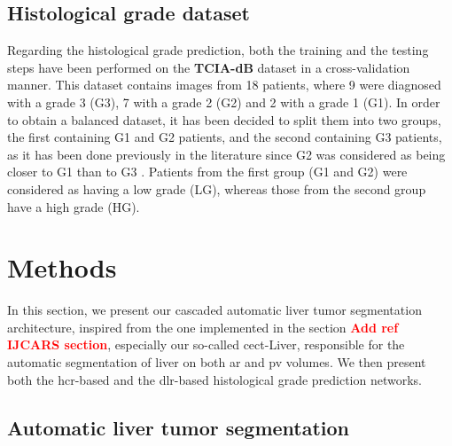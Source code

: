 \documentclass[]{article}
\newcommand{\pplfont}[1]{{\fontfamily{ppl}\selectfont #1}}
\newcommand{\lmttfont}[1]{{\fontfamily{lmtt}\selectfont #1}}
\newcommand{\todo}[1]{{\textcolor{red}{\textbf{#1}}}}
\begin{document}
\subsection{Histological grade dataset}

Regarding the histological grade prediction, both the training and the testing steps have been performed on the \textbf{\lmttfont{TCIA-dB}} dataset in a cross-validation manner.
This dataset contains images from 18 patients, where 9 were diagnosed 
with a grade 3 (G3), 7 with a grade 2 (G2) and 2 with a grade 1 (G1). In order
to obtain a balanced dataset, it has been decided to split them
into two groups, the first containing G1 and G2 patients, and the second containing G3 patients, as it has been done previously in the literature since G2
was considered as being closer to G1 than to G3 \cite{Han2013,Zucman-Rossi2015}. Patients from the first group (G1 and G2) were considered as
having a low grade (LG), whereas those from the second group have a high
grade (HG).


\section{Methods}

In this section, we present our cascaded automatic liver tumor segmentation architecture, inspired from the one implemented in the section \todo{Add ref IJCARS section}, especially our so-called \pplfont{\ac{cect}-Liver}, responsible for the automatic segmentation of liver on both \ac{ar} and \ac{pv} volumes. We then present both the \ac{hcr}-based and the \ac{dlr}-based histological grade prediction networks.


\subsection{Automatic liver tumor segmentation} \label{subsect_auto_liver_tumor_seg}
\end{document}
